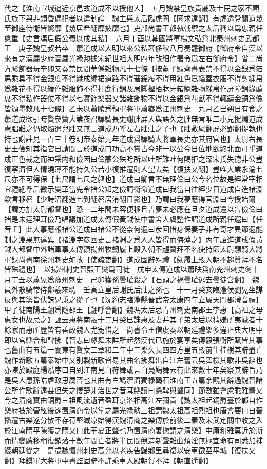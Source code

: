 代之【淮南宣城逼近京邑故道成不以授他人】　五月魏禁皇族貴戚及士民之家不顧氏族下與非類昏偶犯者以違制論　魏主與太后臨虎圈【圈求遠翻】有虎逸登閣道幾至御座侍衛皆驚靡【幾居希翻靡披靡也】吏部尚書王叡執戟禦之太后稱以爲忠親任愈重【史言馮后假公義以成其私】　六月丁酉以輔國將軍楊文弘爲北秦州刺史武都王　庚子魏皇叔若卒　蕭道成以大明以來公私奢侈秋八月奏罷御府【御府令自漢以來有之漢屬少府晉屬光禄勲據宋紀世祖大明四年改細作署令爲左右御府令】省二尚方彫飾器玩辛卯又奏禁民間華僞雜物凡十七條【按蕭子顯齊書表禁不得以金銀爲箔馬乘具不得金銀度不得織成繡裙道路不得著錦履不得用紅色爲幡蓋衣服不得剪綵帛爲雜花不得以綾作雜服飾不得打鹿行錦及局脚檉栢牀牙箱籠雜物綵帛作屏障錦緣薦席不得私作器仗不得以七實飾樂器又諸雜飾物不得以金銀爲花獸不得輒鑄金銅爲像皆頒墨敕凡十七條】乙未以蕭賾爲領軍將軍蕭嶷爲江州刺史　九月乙巳朔日有食之　蕭道成欲引時賢參贊大業夜召驃騎長史謝朏屏人與語久之朏無言唯二小兒捉燭道成慮朏難之仍取燭遣兒朏又無言道成乃呼左右朏莊之子也【朏敷尾翻屏必郢翻捉執也持也謝莊見一百三十卷明帝泰始元年道成爲驃騎大將軍長史亦其府官也】太尉右長史王儉知其指它日請間言於道成曰功高不賞古今非一以公今日位地欲終北面可乎道成正色裁之而神采内和儉因曰儉蒙公殊盻所以吐所難吐何賜拒之深宋氏失德非公豈復寜濟但人情澆薄不能持久公若小復推遷則人望去矣【復扶又翻】豈唯大業永淪七尺亦不可得保【七尺謂七尺之軀也】道成曰卿言不無理儉曰公今名位故是經常宰相宜禮絶羣后微示變革當先令禇公知之儉請銜命道成曰我當自往經少日道成自造禇淵欵言移晷【少詩沼翻造七到翻晷居洧翻日影也】乃謂曰我夢應得官淵曰今授始爾【謂方加太尉都督也】恐一二年間未容便移且吉夢未必應在旦夕道成還以告儉儉曰禇是未逹理耳儉乃唱議加道成太傳假黃鉞使中書舍人虞整作詔道成所親任遐曰【任音壬】此大事應報禇公道成曰禇公不從柰何遐曰彦回惜身保妻子非有奇才異節遐能制之淵果無違異【禇淵字彦回史言禇淵之爲人人皆得而侮薄之】丙午詔進道成假黃鉞大都督中外諸軍事太傳領揚州牧劒履上殿入朝不趨贊拜不名使持節太尉驃騎大將軍録尚書南徐州刺史如故【使疏吏翻】道成固辭殊禮【劒履上殿入朝不趨贊拜不名皆殊禮也】　以揚州刺史晉熙王爕爲司徒　戊申太傅道成以蕭映爲南兖州刺史冬十月丁丑以蕭晃爲豫州刺史　己卯獲孫曇瓘殺之【石頭之禍曇瓘逃去曇徒含翻】　魏員外散騎常侍鄭羲來聘　壬寅立皇后謝氏后莊之孫也　十一月癸亥臨澧侯劉晃坐謀反與其黨皆伏誅晃秉之從子也【沈約志臨澧縣晉武帝太康四年立屬天門郡澧音禮】　甲子徙南陽王翽爲隨郡王【翽呼會翻】魏馮太后忌青州刺史南郡王李惠【高祖之母惠女也故忌之】誣云惠將南叛十二月癸巳誅惠及妻并其子弟太后以猜嫌所夷滅者十餘家而惠所歷皆有善政魏人尤寃惜之　尚書令王僧䖍奏以朝廷禮樂多違正典大明中即以宫縣合和鞞拂【晉志曰鼙舞未詳所起然漢代已施於宴享矣傅毅張衡所賦皆其事也舊曲有五篇一關東有賢女二章和二年中三樂久長四四方皇五殿前生桂樹其辭盡亡魏作新歌五篇泰始中又别製新歌皆易其曲名拂舞出自江左舊云吳舞檢其歌非吳辭也亦陳於殿庭楊泓序曰自到江南見白符舞或言白鳬鳩舞云有此來數十年矣察其辭旨乃是吳人患孫皓虐政思屬晉也其曲有白鳩濟濟獨禄碣石淮南王五篇余觀其辭過魏晉諸公所作歌辭遠甚但失之悽楚非治世之音耳縣讀曰懸鞞與鼙同】節數雖會慮乖雅體又今之清商實由銅爵三祖風流遺音盈耳京洛相高江左彌貴【魏太祖起銅爵臺於鄴自作樂府被於管絃後遂置清商令以掌之屬光禄勲三祖謂魏太祖高祖烈祖也唐會要曰自晉播遷古樂遂分散不存苻堅滅凉始得漢魏清商之樂傳於前後二秦及宋武定關中收之入於江南隋平陳獲之隋又曰此華夏正聲也乃置清商署揔謂之清樂】中庸和雅莫近於斯而情變聽移稍復銷落十數年間亡者將半民間競造新聲雜曲煩淫無極宜命有司悉加補綴朝廷從之　是歲魏懷州刺史高允以老疾告歸鄉里尋復以安車徵至平城【復扶又翻】拜鎭軍大將軍中書監固辭不許乘車入殿朝賀不拜【朝直遥翻】

